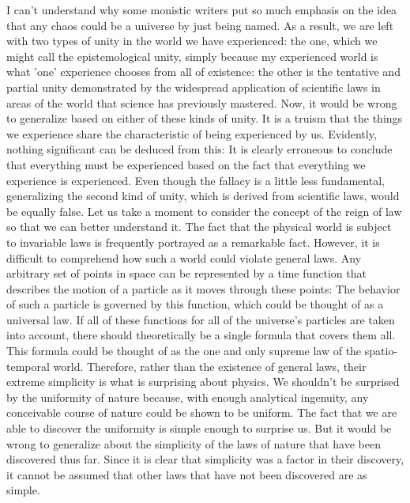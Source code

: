 \documentclass[a4paper,12pt]{book}[2004/02/16]
\theoremstyle{ilemma}
\theoremstyle{itheorem}
\theoremstyle{iother}
\theoremstyle{icorollary}
\theoremstyle{numcorollary}
\theoremstyle{idefinition}
\begin{document}
I can't understand why some monistic writers put so much emphasis on the idea that any chaos could be a universe by just being named. As a result, we are left with two types of unity in the world we have experienced: the one, which we might call the epistemological unity, simply because my experienced world is what 'one' experience chooses from all of existence: the other is the tentative and partial unity demonstrated by the widespread application of scientific laws in areas of the world that science has previously mastered. Now, it would be wrong to generalize based on either of these kinds of unity. It is a truism that the things we experience share the characteristic of being experienced by us. Evidently, nothing significant can be deduced from this: It is clearly erroneous to conclude that everything must be experienced based on the fact that everything we experience is experienced. Even though the fallacy is a little less fundamental, generalizing the second kind of unity, which is derived from scientific laws, would be equally false. Let us take a moment to consider the concept of the reign of law so that we can better understand it. The fact that the physical world is subject to invariable laws is frequently portrayed as a remarkable fact. However, it is difficult to comprehend how such a world could violate general laws. Any arbitrary set of points in space can be represented by a time function that describes the motion of a particle as it moves through these points: The behavior of such a particle is governed by this function, which could be thought of as a universal law. If all of these functions for all of the universe's particles are taken into account, there should theoretically be a single formula that covers them all. This formula could be thought of as the one and only supreme law of the spatio-temporal world. Therefore, rather than the existence of general laws, their extreme simplicity is what is surprising about physics. We shouldn't be surprised by the uniformity of nature because, with enough analytical ingenuity, any conceivable course of nature could be shown to be uniform. The fact that we are able to discover the uniformity is simple enough to surprise us. But it would be wrong to generalize about the simplicity of the laws of nature that have been discovered thus far. Since it is clear that simplicity was a factor in their discovery, it cannot be assumed that other laws that have not been discovered are as simple.
\end{document}
